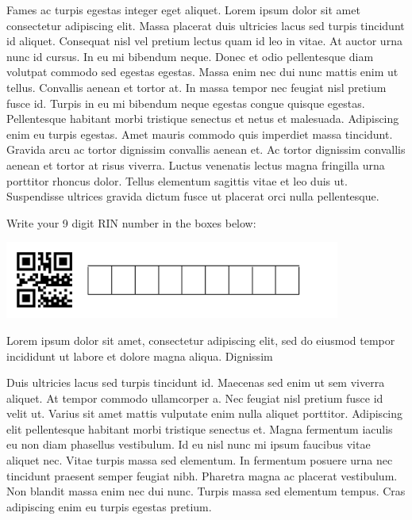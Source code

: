 \documentclass[12pt]{article}
\begin{document}
Fames ac turpis egestas integer eget aliquet. Lorem ipsum dolor sit amet consectetur adipiscing elit. Massa placerat duis ultricies lacus sed turpis tincidunt id aliquet. Consequat nisl vel pretium lectus quam id leo in vitae. At auctor urna nunc id cursus. In eu mi bibendum neque. Donec et odio pellentesque diam volutpat commodo sed egestas egestas. Massa enim nec dui nunc mattis enim ut tellus. Convallis aenean et tortor at. In massa tempor nec feugiat nisl pretium fusce id. Turpis in eu mi bibendum neque egestas congue quisque egestas. Pellentesque habitant morbi tristique senectus et netus et malesuada. Adipiscing enim eu turpis egestas. Amet mauris commodo quis imperdiet massa tincidunt. Gravida arcu ac tortor dignissim convallis aenean et. Ac tortor dignissim convallis aenean et tortor at risus viverra. Luctus venenatis lectus magna fringilla urna porttitor rhoncus dolor. Tellus elementum sagittis vitae et leo duis ut. Suspendisse ultrices gravida dictum fusce ut placerat orci nulla pellentesque.

\vspace{0.1in}
\noindent
\begin{minipage}{4in}
Write your 9 digit RIN number in the boxes below:

\noindent
\includegraphics[height=1in,angle=5]{blank_QR_numeric_id.png}
\end{minipage}
\hfill
\begin{minipage}{2.3in}
Lorem ipsum dolor sit amet, consectetur adipiscing elit, sed do
eiusmod tempor incididunt ut labore et dolore magna aliqua. Dignissim
\end{minipage}

Duis ultricies lacus sed turpis tincidunt id. Maecenas sed enim ut sem viverra aliquet. At tempor commodo ullamcorper a. Nec feugiat nisl pretium fusce id velit ut. Varius sit amet mattis vulputate enim nulla aliquet porttitor. Adipiscing elit pellentesque habitant morbi tristique senectus et. Magna fermentum iaculis eu non diam phasellus vestibulum. Id eu nisl nunc mi ipsum faucibus vitae aliquet nec. Vitae turpis massa sed elementum. In fermentum posuere urna nec tincidunt praesent semper feugiat nibh. Pharetra magna ac placerat vestibulum. Non blandit massa enim nec dui nunc. Turpis massa sed elementum tempus. Cras adipiscing enim eu turpis egestas pretium.
\end{document}
